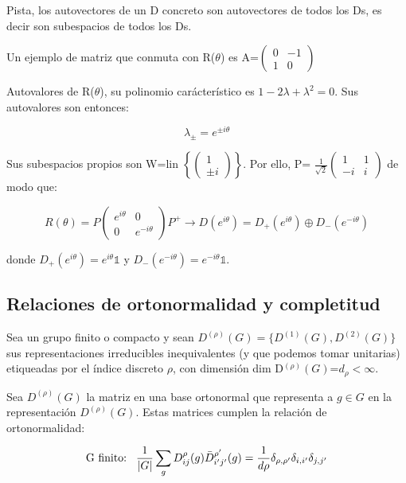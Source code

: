 \bigskip

Pista, los autovectores de un D concreto son autovectores de todos los Ds, es decir son subespacios de todos los Ds.

\bigskip
Un ejemplo de matriz que conmuta con R($\theta$) es A=$\left (\begin{array}{cc}
0 & -1 \\
1 & 0
\end{array} \right)$

Autovalores de R($\theta$), su polinomio carácterístico es $1-2\lambda +\lambda ^2=0$. Sus autovalores son entonces:

$$\lambda_\pm =e^{\pm i\theta}$$

Sus subespacios propios son W=lin $\left \lbrace \left ( \begin{array}{c}
1  \\
\pm i
\end{array}\right) \right\rbrace $.  Por ello, P= $ \frac{1}{\sqrt{2}}\left ( \begin{array}{cc}
1 & 1 \\
-i & i
\end{array}\right) $ de modo que:

$$R(\theta)=P\left( \begin{array}{cc}
e^{i\theta} & 0 \\
0 & e^{-i\theta}
\end{array}\right)P^{+} \to D(e^{i\theta})=D_+(e^{i\theta})\oplus D_-(e^{-i\theta})$$

donde $D_+(e^{i\theta})=e^{i\theta}\mathds{1}$ y $D_-(e^{-i\theta})=e^{-i\theta}\mathds{1}$.

\subsection{Relaciones de ortonormalidad y completitud}

Sea un grupo finito o compacto y sean $D^{(\rho)}(G)=\lbrace D^{(1)}(G), D^{(2)}(G)\rbrace$ sus representaciones irreducibles inequivalentes (y que podemos tomar unitarias) etiqueadas por el índice discreto $\rho$, con dimensión dim D$^{(\rho)}(G)$=$d_\rho <\infty$.

Sea $D^{(\rho)}(G)$ la matriz en una base ortonormal que representa a $g\in G$ en la representación $D^{(\rho )}(G)$. Estas matrices cumplen la relación de ortonormalidad:

$$\text{G finito:} \hspace{0.3cm} \frac{1}{|G|}\sum _g D_{ij}^\rho (g) \bar{D}_{i'j'}^{\rho '}(g)=\frac{1}{d \rho}\delta _{\rho , \rho '}\delta _{i, i'}\delta _{j,j'}$$

